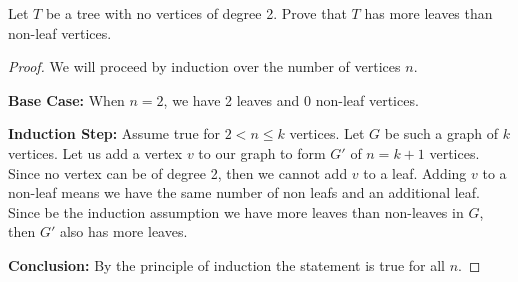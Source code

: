 \documentclass[11pt, oneside]{article}   	%
\begin{document}
Let $T$ be a tree with no vertices of degree 2. Prove that $T$ has more leaves than non-leaf vertices.

\begin{proof}
We will proceed by induction over the number of vertices $n$.

\textbf{Base Case:} When $n=2$, we have 2 leaves and 0 non-leaf vertices.

\textbf{Induction Step:} Assume true for $2 < n \leq k$ vertices. Let $G$ be such a graph of $k$ vertices. Let us add a vertex $v$ to our graph to form $G'$ of $n=k+1$ vertices. Since no vertex can be of degree 2, then we cannot add $v$ to a leaf. Adding $v$ to a non-leaf means we have the same number of non leafs and an additional leaf. Since be the induction assumption we have more leaves than non-leaves in $G$, then $G'$ also has more leaves.

\textbf{Conclusion:} By the principle of induction the statement is true for all $n$.
\end{proof}
\end{document}
